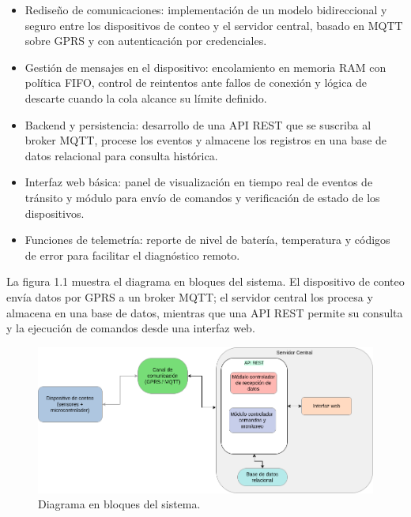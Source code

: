 \begin{itemize}

\item Rediseño de comunicaciones: implementación de un modelo bidireccional y seguro entre los dispositivos de conteo y el servidor central, basado en MQTT sobre GPRS y con autenticación por credenciales.

\item Gestión de mensajes en el dispositivo: encolamiento en memoria RAM con política FIFO, control de reintentos ante fallos de conexión y lógica de descarte cuando la cola alcance su límite definido.

\item Backend y persistencia: desarrollo de una API REST que se suscriba al broker MQTT, procese los eventos y almacene los registros en una base de datos relacional para consulta histórica.

\item Interfaz web básica: panel de visualización en tiempo real de eventos de tránsito y módulo para envío de comandos y verificación de estado de los dispositivos.

\item Funciones de telemetría: reporte de nivel de batería, temperatura y códigos de error para facilitar el diagnóstico remoto.

\end{itemize}

La figura 1.1 muestra el diagrama en bloques del sistema. El dispositivo de conteo envía datos por GPRS a un broker MQTT; el servidor central los procesa y almacena en una base de datos, mientras que una API REST permite su consulta y la ejecución de comandos desde una interfaz web.

\vspace{1cm}

\begin{figure}[htbp]
  \centering
  \includegraphics[width=\linewidth]{./Figures/diagBloques.png}
  \caption{Diagrama en bloques del sistema.}
  \label{fig:diag_bloques}
\end{figure}

\vspace{1cm}












